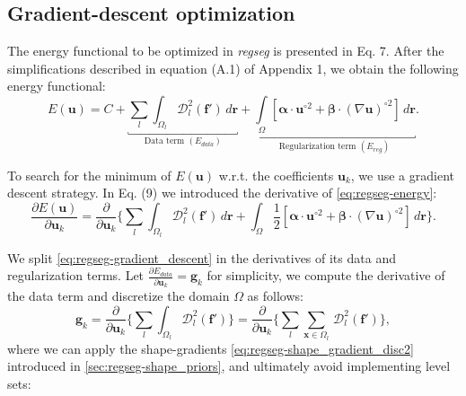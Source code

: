 \documentclass[a4paper]{report}
\providecommand{\mdist}[2]{ \mathcal{D}_{#2}^2(\mathbf{#1}) }
\renewcommand{\vec}[1]{\mathbf{#1}}
\begin{document}
\subsection{Gradient-descent optimization}\label{sec:regseg-gradient_descent}
The energy functional to be optimized in \emph{regseg} is presented in Eq. 7.
After the simplifications described in equation (A.1) of Appendix 1, we obtain the
  following energy functional:
  \begin{equation}
  E(\vec{u}) = C + \underbracket{\underset{l}{\sum} \int_{\Omega_l}
  \mdist{f'}{l} \,d\vec{r}}_{\text{Data term } (E_{data})}
  + \underbracket{\underset{\Omega}{\int} \left[ \boldsymbol{\alpha} \cdot \vec{u}^{\circ2}
  + \boldsymbol{\beta} \cdot (\nabla \vec{u})^{\circ2} \right] \,d\vec{r}}_{\text{Regularization term } (E_{reg})}.
  \label{eq:regseg-energy}
  \end{equation}

To search for the minimum of $E(\vec{u})$ w.r.t. the coefficients $\vec{u}_k$, we use a gradient descent strategy.
In Eq. (9) we introduced the derivative of \eqref{eq:regseg-energy}:
  \begin{equation}
  \frac{\partial E(\vec{u})}{\partial \vec{u}_k} =
  \frac{ \partial }{\partial \vec{u}_k} \Big\{
  \underset{l}{\sum} \int_{\Omega_l} \mdist{f'}{l} \,d\vec{r}
  + \int_{\Omega} \frac12 [ \boldsymbol{\alpha} \cdot \vec{u}^{\circ2}
  + \boldsymbol{\beta} \cdot (\nabla \vec{u})^{\circ2} ] \,d\vec{r}
  \Big\}.
  \label{eq:regseg-gradient_descent}
  \end{equation}

We split \eqref{eq:regseg-gradient_descent} in the derivatives of its data and regularization terms.
Let $\frac{\partial E_{data}}{\partial \vec{u}_k} = \vec{g}_k$ for simplicity,
  we compute the derivative of the data term and discretize the domain $\Omega$ as follows:
\begin{equation}
  \vec{g}_k =
  \frac{ \partial }{\partial \vec{u}_k} \Big\{
  \underset{l}{\sum} \int_{\Omega_l} \mdist{f'}{l} \Big\} =
  \frac{ \partial }{\partial \vec{u}_k} \Big\{ \underset{l}{\sum} \underset{\vec{x} \in \Omega_l}{\sum} \, \mdist{f'}{l} \Big\},
  \label{eq:regseg-data_derivative}
\end{equation}
  where we can apply the shape-gradients \eqref{eq:regseg-shape_gradient_disc2} introduced
  in \autoref{sec:regseg-shape_priors}, and ultimately avoid implementing level sets:
\end{document}
